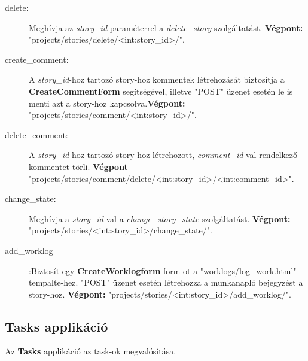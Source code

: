 \begin{itemize}
\begin{description}
		\item[delete:] Meghívja az \textit{story\_id} paraméterrel a \textit{delete\_story} szolgáltatást. \textbf{Végpont:} "projects/stories/delete/<int:story\_id>/".
		\item[create\_comment:] A \textit{story\_id}-hoz tartozó story-hoz kommentek létrehozását biztosítja a \textbf{CreateCommentForm} segítségével, illetve "POST" üzenet esetén le is menti azt a story-hoz kapcsolva.\textbf{Végpont:} "projects/stories/comment/<int:story\_id>/".
		\item[delete\_comment:] A \textit{story\_id}-hoz tartozó story-hoz létrehozott, \textit{comment\_id}-val rendelkező kommentet törli. \textbf{Végpont} "projects/stories/comment/delete/<int:story\_id>/<int:comment\_id>".
		\item[change\_state:] Meghívja a \textit{story\_id}-val a \textit{change\_story\_state} szolgáltatást. \textbf{Végpont:} "projects/stories/<int:story\_id>/change\_state/".
		\item[add\_worklog]:Biztosít egy \textbf{CreateWorklogform} form-ot a "worklogs/log\_work.html" tempalte-hez. "POST" üzenet esetén létrehozza a munkanapló bejegyzést a story-hoz. \textbf{Végpont:} "projects/stories/<int:story\_id>/add\_worklog/".
	\end{description}
\end{itemize}	

\subsection{Tasks applikáció}

Az \textbf{Tasks} applikáció az task-ok megvalósítása. 

